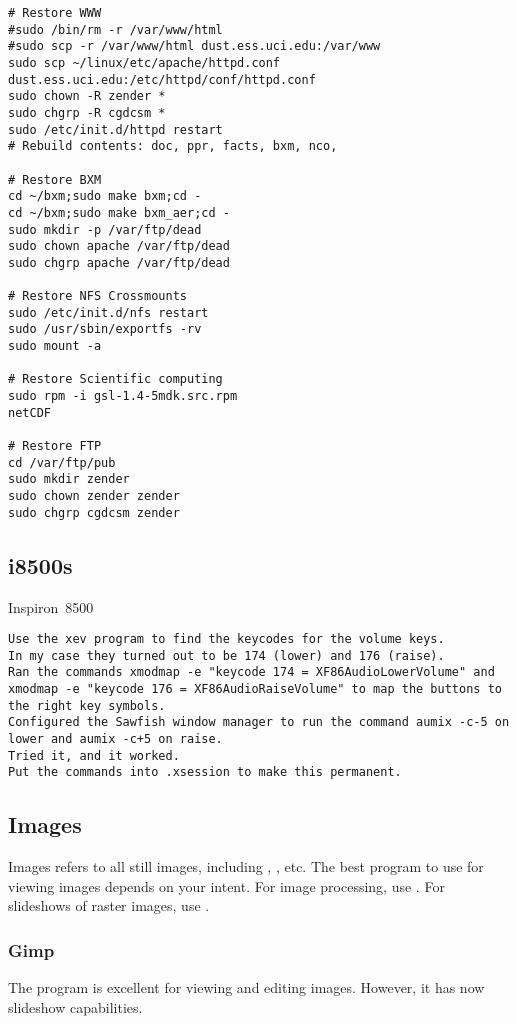 \documentclass[12pt,twoside]{article}
\begin{document}
\begin{verbatim}
# Restore WWW
#sudo /bin/rm -r /var/www/html
#sudo scp -r /var/www/html dust.ess.uci.edu:/var/www
sudo scp ~/linux/etc/apache/httpd.conf dust.ess.uci.edu:/etc/httpd/conf/httpd.conf
sudo chown -R zender *
sudo chgrp -R cgdcsm *
sudo /etc/init.d/httpd restart
# Rebuild contents: doc, ppr, facts, bxm, nco, 

# Restore BXM
cd ~/bxm;sudo make bxm;cd -
cd ~/bxm;sudo make bxm_aer;cd -
sudo mkdir -p /var/ftp/dead
sudo chown apache /var/ftp/dead
sudo chgrp apache /var/ftp/dead

# Restore NFS Crossmounts
sudo /etc/init.d/nfs restart
sudo /usr/sbin/exportfs -rv
sudo mount -a

# Restore Scientific computing
sudo rpm -i gsl-1.4-5mdk.src.rpm
netCDF

# Restore FTP
cd /var/ftp/pub
sudo mkdir zender
sudo chown zender zender
sudo chgrp cgdcsm zender
\end{verbatim}

\subsection{i8500s}\label{sxn:i8500}
Inspiron~8500
\begin{verbatim}
Use the xev program to find the keycodes for the volume keys. 
In my case they turned out to be 174 (lower) and 176 (raise).  
Ran the commands xmodmap -e "keycode 174 = XF86AudioLowerVolume" and
xmodmap -e "keycode 176 = XF86AudioRaiseVolume" to map the buttons to
the right key symbols.  
Configured the Sawfish window manager to run the command aumix -c-5 on
lower and aumix -c+5 on raise.  
Tried it, and it worked. 
Put the commands into .xsession to make this permanent. 
\end{verbatim}

\subsection{Images}\label{sxn:img}
Images refers to all still images, including ,
, etc. 
The best program to use for viewing images depends on your intent.
For image processing, use .
For slideshows of raster images, use .
\subsubsection{Gimp}\label{sxn:gimp}
The  program is excellent for viewing and editing images.
However, it has now slideshow capabilities.
\end{document}
